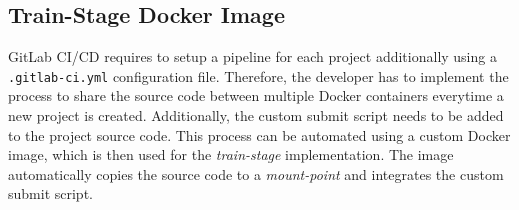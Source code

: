 \subsection{Train-Stage Docker Image}
GitLab CI/CD requires to setup a pipeline for each project additionally using a \texttt{.gitlab-ci.yml} configuration file.
Therefore, the developer has to implement the process to share the source code between multiple Docker containers everytime a new project is created. Additionally, the custom submit script needs to be added to the project source code.
This process can be automated using a custom Docker image, which is then used for the \textit{train-stage} implementation. The image automatically copies the source code to a \textit{mount-point} and integrates the custom submit script.